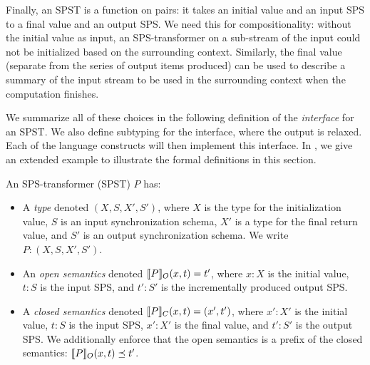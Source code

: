 Finally, an SPST is a function on pairs:
it takes an initial value and an input
SPS to a final value and an output SPS.
We need this for compositionality: without the initial value as input, an SPS-transformer
on a sub-stream of the input could not be initialized based on the surrounding context.
Similarly, the final value (separate from the series of output items produced) can be
used to describe a summary of the input stream to be used in the surrounding context
when the computation finishes.


We summarize all of these choices in the following definition of the \emph{interface}
for an SPST.
We also define subtyping for the interface, where the output is relaxed.
Each of the language constructs will then implement this interface.
In , we give an extended example
to illustrate the formal definitions in this section.

\begin{definition}
An SPS-transformer (SPST) $P$
has:
\begin{itemize}
\item A \emph{type} denoted $(X, S, X', S')$,
where
$X$ is the type for the initialization value,
$S$ is an input synchronization schema,
$X'$ is a type for the final return value,
and $S'$ is an output synchronization schema.
We write $P: (X, S, X', S')$.

\item An \emph{open semantics} denoted $\spstsemO{x}{t}{P} = t'$,
where $x: X$ is the initial value, $t: S$ is the input SPS,
and $t': S'$ is the incrementally produced output SPS.

\item A \emph{closed semantics} denoted $\spstsemC{x}{t}{P} = (x', t')$,
where $x': X'$ is the initial value, $t: S$ is the input SPS,
$x': X'$ is the final value, and $t': S'$ is the output SPS.
We additionally enforce that the open semantics is a prefix
of the closed semantics:
$\spstsemO{x}{t}{P} \prefix t'$.

\end{itemize}
\end{definition}

